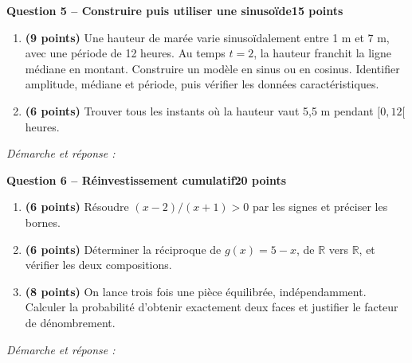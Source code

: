\documentclass[11pt,a4paper]{article}
\begin{document}
\newpage
{\large\bfseries Question 5 -- Construire puis utiliser une sinusoïde}\hfill\textbf{15 points}\par
\begin{enumerate}
\item \textbf{(9 points)} Une hauteur de marée varie sinusoïdalement entre 1 m et 7 m, avec une période de 12 heures. Au temps \(t=2\), la hauteur franchit la ligne médiane en montant. Construire un modèle en sinus ou en cosinus. Identifier amplitude, médiane et période, puis vérifier les données caractéristiques.
\item \textbf{(6 points)} Trouver tous les instants où la hauteur vaut 5,5 m pendant \([0,12[\) heures.
\end{enumerate}
\vspace{3mm}\textit{Démarche et réponse :}\par\vfill

\newpage
{\large\bfseries Question 6 -- Réinvestissement cumulatif}\hfill\textbf{20 points}\par
\begin{enumerate}
\item \textbf{(6 points)} Résoudre \((x-2)/(x+1)>0\) par les signes et préciser les bornes.
\item \textbf{(6 points)} Déterminer la réciproque de \(g(x)=5-x\), de \(\mathbb R\) vers \(\mathbb R\), et vérifier les deux compositions.
\item \textbf{(8 points)} On lance trois fois une pièce équilibrée, indépendamment. Calculer la probabilité d’obtenir exactement deux faces et justifier le facteur de dénombrement.
\end{enumerate}
\vspace{3mm}\textit{Démarche et réponse :}\par\vfill
\end{document}
